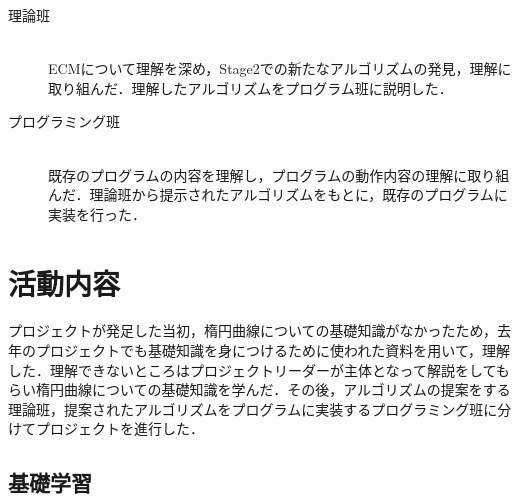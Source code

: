 \documentclass[openany,11pt,papersize]{jsbook}
\begin{document}
\begin{description}
 \item[理論班]\mbox{}\\ 
	    ECMについて理解を深め，Stage2での新たなアルゴリズムの発見，理解に取り組んだ．理解したアルゴリズムをプログラム班に説明した．

 \item[プログラミング班]\mbox{}\\
	    既存のプログラムの内容を理解し，プログラムの動作内容の理解に取り組んだ．理論班から提示されたアルゴリズムをもとに，既存のプログラムに実装を行った．
\end{description}

\chapter{活動内容}

プロジェクトが発足した当初，楕円曲線についての基礎知識がなかったため，去年のプロジェクトでも基礎知識を身につけるために使われた資料を用いて，理解した．理解できないところはプロジェクトリーダーが主体となって解説をしてもらい楕円曲線についての基礎知識を学んだ．その後，アルゴリズムの提案をする理論班，提案されたアルゴリズムをプログラムに実装するプログラミング班に分けてプロジェクトを進行した．


\section{基礎学習}
\end{document}
